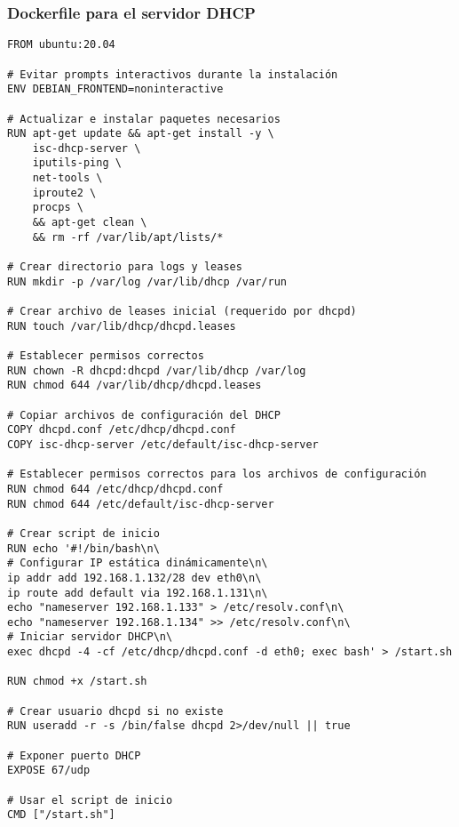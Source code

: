 \subsubsection{Dockerfile para el servidor DHCP}
\begin{lstlisting}[language=RouterOS]
FROM ubuntu:20.04

# Evitar prompts interactivos durante la instalación
ENV DEBIAN_FRONTEND=noninteractive

# Actualizar e instalar paquetes necesarios
RUN apt-get update && apt-get install -y \
    isc-dhcp-server \
    iputils-ping \
    net-tools \
    iproute2 \
    procps \
    && apt-get clean \
    && rm -rf /var/lib/apt/lists/*

# Crear directorio para logs y leases
RUN mkdir -p /var/log /var/lib/dhcp /var/run

# Crear archivo de leases inicial (requerido por dhcpd)
RUN touch /var/lib/dhcp/dhcpd.leases

# Establecer permisos correctos
RUN chown -R dhcpd:dhcpd /var/lib/dhcp /var/log
RUN chmod 644 /var/lib/dhcp/dhcpd.leases

# Copiar archivos de configuración del DHCP
COPY dhcpd.conf /etc/dhcp/dhcpd.conf
COPY isc-dhcp-server /etc/default/isc-dhcp-server

# Establecer permisos correctos para los archivos de configuración
RUN chmod 644 /etc/dhcp/dhcpd.conf
RUN chmod 644 /etc/default/isc-dhcp-server

# Crear script de inicio
RUN echo '#!/bin/bash\n\
# Configurar IP estática dinámicamente\n\
ip addr add 192.168.1.132/28 dev eth0\n\
ip route add default via 192.168.1.131\n\
echo "nameserver 192.168.1.133" > /etc/resolv.conf\n\
echo "nameserver 192.168.1.134" >> /etc/resolv.conf\n\
# Iniciar servidor DHCP\n\
exec dhcpd -4 -cf /etc/dhcp/dhcpd.conf -d eth0; exec bash' > /start.sh

RUN chmod +x /start.sh

# Crear usuario dhcpd si no existe
RUN useradd -r -s /bin/false dhcpd 2>/dev/null || true

# Exponer puerto DHCP
EXPOSE 67/udp

# Usar el script de inicio
CMD ["/start.sh"] 
\end{lstlisting}

